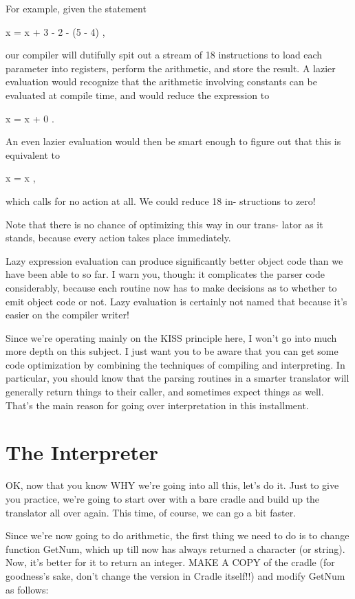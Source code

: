 \documentclass[float=false, crop=false]{standalone}
\begin{document}
For example, given the statement

               x = x + 3 - 2 - (5 - 4)  ,

our compiler will dutifully spit out a stream of 18 instructions to load each
parameter into registers, perform the arithmetic, and store the result. A lazier
evaluation would recognize that the arithmetic involving constants can be
evaluated at compile time, and would reduce the expression to

               x = x + 0  .

An even lazier evaluation would then be smart enough to figure out that this is
equivalent to

               x = x  ,

which calls for no action at all. We could reduce 18 in- structions to zero!

Note that there is no chance of optimizing this way in our trans- lator as it
stands, because every action takes place immediately.

Lazy expression evaluation can produce significantly better object code than we
have been able to so far. I warn you, though: it complicates the parser code
considerably, because each routine now has to make decisions as to whether to
emit object code or not. Lazy evaluation is certainly not named that because
it's easier on the compiler writer!

Since we're operating mainly on the KISS principle here, I won't go into much
more depth on this subject. I just want you to be aware that you can get some
code optimization by combining the techniques of compiling and interpreting. In
particular, you should know that the parsing routines in a smarter translator
will generally return things to their caller, and sometimes expect things as
well. That's the main reason for going over interpretation in this installment.


\section{The Interpreter}

OK, now that you know WHY we're going into all this, let's do it. Just to give
you practice, we're going to start over with a bare cradle and build up the
translator all over again. This time, of course, we can go a bit faster.

Since we're now going to do arithmetic, the first thing we need to do is to
change function GetNum, which up till now has always returned a character (or
string). Now, it's better for it to return an integer. MAKE A COPY of the cradle
(for goodness's sake, don't change the version in Cradle itself!!) and modify
GetNum as follows:
\end{document}

